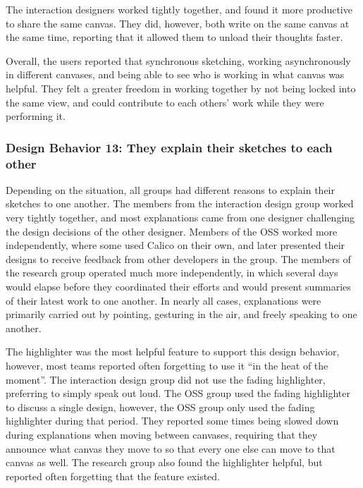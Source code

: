 The interaction designers worked tightly together, and found it more productive to share the same canvas. They did, however, both write on the same canvas at the same time, reporting that it allowed them to unload their thoughts faster.

Overall, the users reported that synchronous sketching, working asynchronously in different canvases, and being able to see who is working in what canvas was helpful. They felt a greater freedom in working together by not being locked into the same view, and could contribute to each others' work while they were performing it. 

%

\subsubsection{Design Behavior 13: They explain their sketches to each other}

Depending on the situation, all groups had different reasons to explain their sketches to one another. The members from the interaction design group worked very tightly together, and most explanations came from one designer challenging the design decisions of the other designer. Members of the OSS worked more independently, where some used Calico on their own, and later presented their designs to receive feedback from other developers in the group. The members of the research group operated much more independently, in which several days would elapse before they coordinated their efforts and would present summaries of their latest work to one another. In nearly all cases, explanations were primarily carried out by pointing, gesturing in the air, and freely speaking to one another.

The highlighter was the most helpful feature to support this design behavior, however, most teams reported often forgetting to use it ``in the heat of the moment''. The interaction design group did not use the fading highlighter, preferring to simply speak out loud. The OSS group used the fading highlighter to discuss a single design, however, the OSS group only used the fading highlighter during that period. They reported some times being slowed down during explanations when moving between canvases, requiring that they announce what canvas they move to so that every one else can move to that canvas as well. The research group also found the highlighter helpful, but reported often forgetting that the feature existed.

